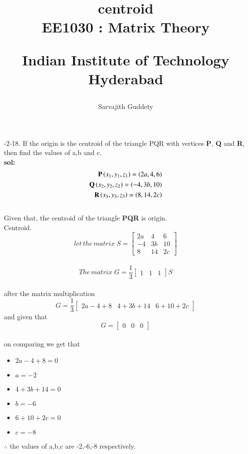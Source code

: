 \documentclass{article}[20pt]
\title{centroid\\
\large{EE1030 : Matrix Theory}

Indian Institute of Technology Hyderabad
}
\author{Sarvajith Guddety}
\theoremstyle{remark}
\begin{document}
-2-18. If the origin is the centroid of the triangle PQR with vertices
\textbf{P},
\textbf{Q} and \textbf{R},
then find the values of a,b and c. \\
\textbf{sol:}
\begin{align*}
\textbf{P}\left(x_1,y_1,z_1\right) = \left(2a,4,6\right)\\
\textbf{Q}\left(x_2,y_2,z_2\right) = \left(-4,3b,10\right)\\
\textbf{R}\left(x_3,y_3,z_3\right) = \left(8,14,2c\right)\\
\end{align*} \\
Given that, the centroid of the triangle \textbf{PQR} is origin. \\
Centroid.
$$let\,the\,matrix\;S =
\begin{bmatrix}
2a&4&6\\
-4&3b&10\\
8&14&2c
\end{bmatrix}$$\\
$$The\,matrix\;G = \frac{1}{3}
\begin{bmatrix}
    1&1&1
    \end{bmatrix}S$$\\
    after the matrix multiplication
    $$G =
    \frac{1}{3}
    \begin{bmatrix}
        2a-4+8&4+3b+14&6+10+2c
	\end{bmatrix}$$
	and given that
	$$G =
	\begin{bmatrix}
	    0&0&0
	    \end{bmatrix}$$\\
	    on comparing we get that
	    \begin{multicols}{3}
	    \begin{itemize}
	    \item $2a -4 + 8 = 0$
	    \item $a = -2$
	    \columnbreak
	    \item $4 + 3b + 14 = 0$
	    \item $b = -6$
	    \columnbreak
	    \item $6 + 10 + 2c = 0$
	    \item $c = -8$
	    \end{itemize}
	    \end{multicols}
	    $\therefore $ the values of a,b,c are -2,-6,-8 respectively.
	     
	     
\end{document}
